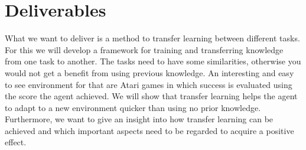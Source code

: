 \section{Deliverables}
\label{sec:deliverables}

What we want to deliver is a method to transfer learning between different tasks. For this we will develop a framework for training and transferring knowledge from one task to another. The tasks need to have some similarities, otherwise you would not get a benefit from using previous knowledge. An interesting and easy to see environment for that are Atari games in which success is evaluated using the score the agent achieved. We will show that transfer learning helps the agent to adapt to a new environment quicker than using no prior knowledge. Furthermore, we want to give an insight into how transfer learning can be achieved and which important aspects need to be regarded to acquire a positive effect.
